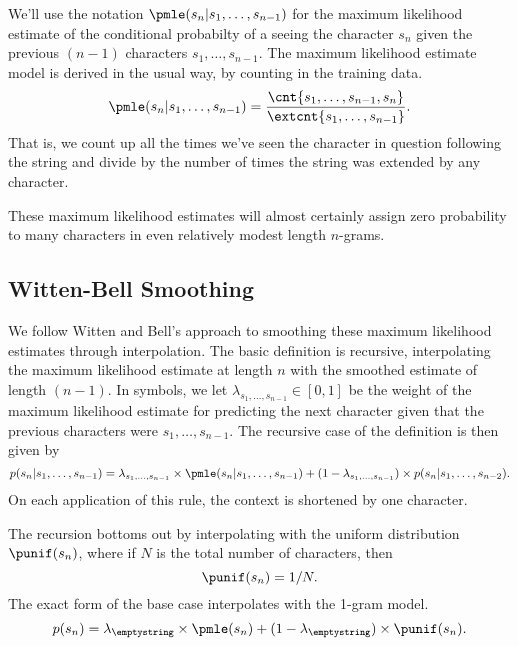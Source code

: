 We'll use the notation $\pmle(s_n|s_1,\ldots,s_{n-1})$ for
the maximum likelihood estimate of the conditional probabilty of a
seeing the character $s_n$ given the previous $(n-1)$ characters
$s_1,\ldots,s_{n-1}$.  The maximum likelihood estimate model is
derived in the usual way, by counting in the training data.
%
\begin{equation}
\pmle(s_n|s_1,\ldots,s_{n-1})
= \frac{\cnt{s_1,\ldots,s_{n-1},s_{n}}}
       {\extcnt{s_1,\ldots,s_{n-1}}}.
\end{equation}
%
That is, we count up all the times we've seen the character in
question following the string and divide by the number of times
the string was extended by any character.

These maximum likelihood estimates will almost certainly assign zero
probability to many characters in even relatively modest length
$n$-grams. 

\subsection{Witten-Bell Smoothing}

We follow Witten and Bell's approach to smoothing these maximum
likelihood estimates through interpolation.  The basic definition is
recursive, interpolating the maximum likelihood estimate at length $n$
with the smoothed estimate of length $(n-1)$.  In symbols, we let
$\lambda_{s_1,\ldots,s_{n-1}} \in [0,1]$ be the weight of the maximum
likelihood estimate for predicting the next character given that the
previous characters were $s_1,\ldots,s_{n-1}$.  The recursive case
of the definition is then given by
%
\begin{equation}
p(s_n|s_1,\ldots,s_{n-1})
= \lambda_{s_1,\ldots,s_{n-1}} \times \pmle(s_n|s_1,\ldots,s_{n-1})
+
(1 - \lambda_{s_1,\ldots,s_{n-1}}) \times p(s_n|s_1,\ldots,s_{n-2}).
\end{equation}
%
On each application of this rule, the context is shortened by one
character.

The recursion bottoms out by interpolating with the uniform
distribution $\punif(s_n)$, where if $N$ is the total number
of characters, then 
%
\begin{equation}
\punif(s_n) = 1/N.
\end{equation}
%
The exact form of the base case interpolates with the 1-gram
model.
%
\begin{equation}
p(s_n) = \lambda_{\emptystring} \times \pmle(s_n)
+ (1 - \lambda_{\emptystring}) \times \punif(s_n).
\end{equation}


